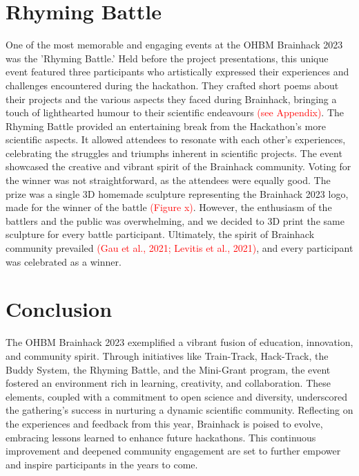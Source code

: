 \documentclass{article}
\begin{document}
\section{Rhyming Battle}

One of the most memorable and engaging events at the OHBM Brainhack 2023 was the 'Rhyming Battle.'
Held before the project presentations, this unique event featured three participants who artistically expressed their experiences and challenges encountered during the hackathon.
They crafted short poems about their projects and the various aspects they faced during Brainhack, bringing a touch of lighthearted humour to their scientific endeavours \textcolor{red}{(see Appendix)}.
The Rhyming Battle provided an entertaining break from the Hackathon's more scientific aspects.
It allowed attendees to resonate with each other's experiences, celebrating the struggles and triumphs inherent in scientific projects.
The event showcased the creative and vibrant spirit of the Brainhack community.
Voting for the winner was not straightforward, as the attendees were equally good.
The prize was a single 3D homemade sculpture representing the Brainhack 2023 logo, made for the winner of the battle \textcolor{red}{(Figure x)}.
However, the enthusiasm of the battlers and the public was overwhelming, and we decided to 3D print the same sculpture for every battle participant.
Ultimately, the spirit of Brainhack community prevailed \cite{gau2021brainhack} \textcolor{red}{(Gau et al., 2021; Levitis et al., 2021)}, and every participant was celebrated as a winner.

\section{Conclusion}

The OHBM Brainhack 2023 exemplified a vibrant fusion of education, innovation, and community spirit.
Through initiatives like Train-Track, Hack-Track, the Buddy System, the Rhyming Battle, and the Mini-Grant program, the event fostered an environment rich in learning, creativity, and collaboration.
These elements, coupled with a commitment to open science and diversity, underscored the gathering's success in nurturing a dynamic scientific community.
Reflecting on the experiences and feedback from this year, Brainhack is poised to evolve, embracing lessons learned to enhance future hackathons.
This continuous improvement and deepened community engagement are set to further empower and inspire participants in the years to come.

{}

\end{document}
